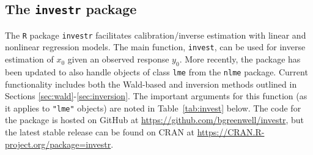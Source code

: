 \documentclass{article}\usepackage[]{graphicx}\usepackage[]{color}
\begin{document}
\subsection[The investr package]{The \texttt{investr} package}

The \texttt{R} package \texttt{investr} facilitates calibration/inverse estimation with linear and nonlinear regression models.  The main function, \texttt{invest}, can be used for inverse estimation of $x_0$ given an observed response $y_0$.  More recently, the package has been updated to also handle objects of class \texttt{lme} from the \texttt{nlme} package.  Current functionality includes both the Wald-based and inversion methods outlined in Sections \ref{sec:wald}-\ref{sec:inversion}.  The important arguments for this function (as it applies to \texttt{"lme"} objects) are noted in Table~\ref{tab:invest} below.  The code for the package is hosted on GitHub at \url{https://github.com/bgreenwell/investr}, but the latest stable release can be found on CRAN at \url{https://CRAN.R-project.org/package=investr}.
\end{document}

